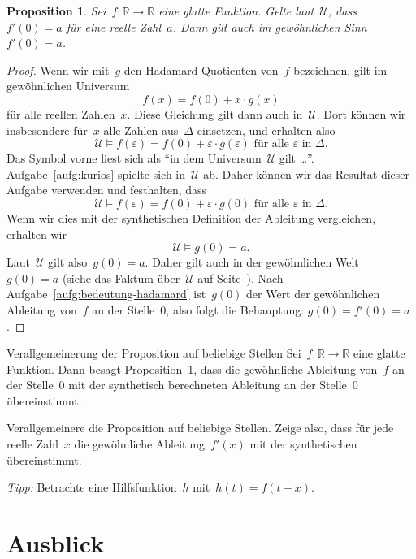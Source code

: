 \documentclass[twoside]{../zirkelblatt}
\newcommand{\RR}{\mathbb{R}}
\newcommand{\U}{\mathcal{U}}
\theoremstyle{definition}
\theoremstyle{plain}
\newtheorem{prop}[defn]{Proposition}
\theoremstyle{remark}
\begin{document}
\begin{prop}\label{prop:ableitung-sdg-gew}
Sei~$f : \RR \to \RR$ eine glatte Funktion. Gelte laut~$\U$,
dass~$f'(0) = a$ für eine reelle Zahl~$a$. Dann gilt auch im gewöhnlichen
Sinn~$f'(0) = a$.
\end{prop}
\begin{proof}Wenn wir mit~$g$ den Hadamard-Quotienten von~$f$ bezeichnen, gilt
im gewöhnlichen Universum
\[ f(x) = f(0) + x \cdot g(x) \]
für alle reellen Zahlen~$x$. Diese Gleichung gilt dann auch in~$\U$. Dort
können wir insbesondere für~$x$ alle Zahlen aus~$\Delta$ einsetzen, und
erhalten also
\[ \U \models \text{$f(\varepsilon) = f(0) + \varepsilon \cdot g(\varepsilon)$ für
alle~$\varepsilon$ in~$\Delta$.} \]
Das Symbol vorne liest sich als "`in dem Universum~$\U$ gilt \ldots"'.
Aufgabe~\ref{aufg:kurios} spielte sich in~$\U$ ab. Daher können wir das
Resultat dieser Aufgabe verwenden und festhalten, dass
\[ \U \models \text{$f(\varepsilon) = f(0) + \varepsilon \cdot g(0)$ für
alle~$\varepsilon$ in~$\Delta$.} \]
Wenn wir dies mit der synthetischen Definition der Ableitung vergleichen,
erhalten wir
\[ \U \models g(0) = a. \]
Laut~$\U$ gilt also~$g(0) = a$. Daher gilt auch in der gewöhnlichen Welt~$g(0)
= a$ (siehe das Faktum über~$\U$ auf Seite~\pageref{fact:sdg-universum}). Nach
Aufgabe~\ref{aufg:bedeutung-hadamard} ist~$g(0)$ der Wert der gewöhnlichen
Ableitung von~$f$ an der Stelle~$0$, also folgt die Behauptung: $g(0) = f'(0) =
a$.
\end{proof}

\begin{aufgabeShaded}{Verallgemeinerung der Proposition auf beliebige Stellen}
Sei~$f : \RR \to \RR$ eine glatte Funktion. Dann besagt
Proposition~\ref{prop:ableitung-sdg-gew}, dass die gewöhnliche Ableitung
von~$f$ an der Stelle~$0$ mit der synthetisch berechneten Ableitung an der
Stelle~$0$ übereinstimmt.

Verallgemeinere die Proposition auf beliebige Stellen. Zeige also, dass für
jede reelle Zahl~$x$ die gewöhnliche Ableitung~$f'(x)$ mit der synthetischen
übereinstimmt.

\emph{Tipp:} Betrachte eine Hilfsfunktion~$h$ mit~$h(t) = f(t-x)$.
\end{aufgabeShaded}


\section{Ausblick}






\end{document}
